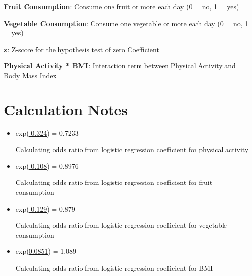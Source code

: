 \documentclass[11pt]{article}
\begin{document}
\begin{codeoutput}
\begin{table}[h]
\begin{threeparttable}
\begin{tablenotes}
\item \textbf{Fruit Consumption}: Consume one fruit or more each day (0 = no, 1 = yes)
\item \textbf{Vegetable Consumption}: Consume one vegetable or more each day (0 = no, 1 = yes)
\item \textbf{z}: Z-score for the hypothesis test of zero Coefficient
\item \textbf{Physical Activity * BMI}: Interaction term between Physical Activity and Body Mass Index
\end{tablenotes}
\end{threeparttable}
\end{table}

\end{codeoutput}

\section{Calculation Notes}
\begin{itemize}
\item{exp(\hyperlink{A2a}{-0.324}) = 0.7233

Calculating odds ratio from logistic regression coefficient for physical activity}
\item{exp(\hyperlink{A3a}{-0.108}) = 0.8976

Calculating odds ratio from logistic regression coefficient for fruit consumption}
\item{exp(\hyperlink{A4a}{-0.129}) = 0.879

Calculating odds ratio from logistic regression coefficient for vegetable consumption}
\item{exp(\hyperlink{A5a}{0.0851}) = 1.089

Calculating odds ratio from logistic regression coefficient for BMI}
\end{itemize}
\end{document}
